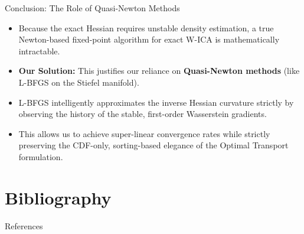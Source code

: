 \documentclass{beamer}
\begin{document}
\begin{frame}{Conclusion: The Role of Quasi-Newton Methods}
  \begin{itemize}
    \item Because the exact Hessian requires unstable density estimation, a true Newton-based fixed-point algorithm for exact W-ICA is mathematically intractable.
    \item \textbf{Our Solution:} This justifies our reliance on \textbf{Quasi-Newton methods} (like L-BFGS on the Stiefel manifold).
    \item L-BFGS intelligently approximates the inverse Hessian curvature strictly by observing the history of the stable, first-order Wasserstein gradients.
    \item This allows us to achieve super-linear convergence rates while strictly preserving the CDF-only, sorting-based elegance of the Optimal Transport formulation.
  \end{itemize}
\end{frame}


\section{Bibliography}

\begin{frame}[allowframebreaks]{References}

\end{frame}
\end{document}
